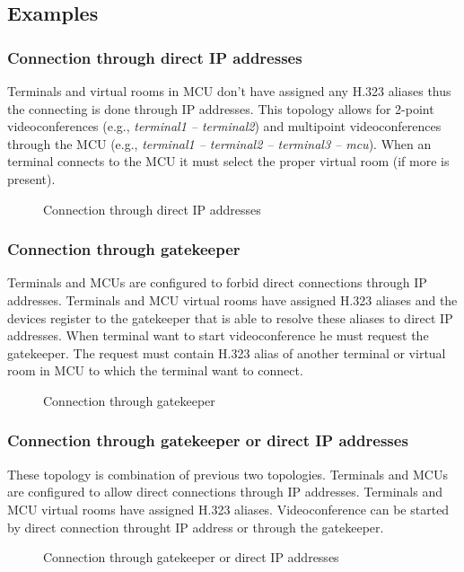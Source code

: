 \documentclass[a4paper]{report}
\newcommand{\graph}[4]{
\begin{figure}[h!]
\centering\scalebox{\ifx&#4& 0.7 \else #4 \fi}{}
\label{#1}
\caption{#3}
\end{figure}
}
\begin{document}
\subsection{Examples}

\subsubsection{Connection through direct IP addresses}

Terminals and virtual rooms in MCU don't have assigned any H.323 aliases thus the connecting is done through IP addresses. This topology allows for 2-point videoconferences (e.g., \emph{terminal1 -- terminal2}) and multipoint videoconferences through the MCU (e.g., \emph{terminal1 -- terminal2 -- terminal3 -- mcu}). When an terminal connects to the MCU it must select the proper virtual room (if more is present).

\graph{graph:h323:direct}{graph/h323_direct.tex}{Connection through direct IP addresses}{}


\subsubsection{Connection through gatekeeper}

Terminals and MCUs are configured to forbid direct connections through IP addresses. Terminals and MCU virtual rooms have assigned H.323 aliases and the devices register to the gatekeeper that is able to resolve these aliases to direct IP addresses. When terminal want to start videoconference he must request the gatekeeper. The request must contain H.323 alias of another terminal or virtual room in MCU to which the terminal want to connect.

\graph{graph:h323:gatekeeper}{graph/h323_gatekeeper.tex}{Connection through gatekeeper}{}


\subsubsection{Connection through gatekeeper or direct IP addresses}

These topology is combination of previous two topologies. Terminals and MCUs are configured to allow direct connections through IP addresses. Terminals and MCU virtual rooms have assigned H.323 aliases. Videoconference can be started by direct connection throught IP address or through the gatekeeper.

\graph{graph:h323:gatekeeper}{graph/h323_gatekeeper_or_direct.tex}{Connection through gatekeeper or direct IP addresses}{}
\end{document}
